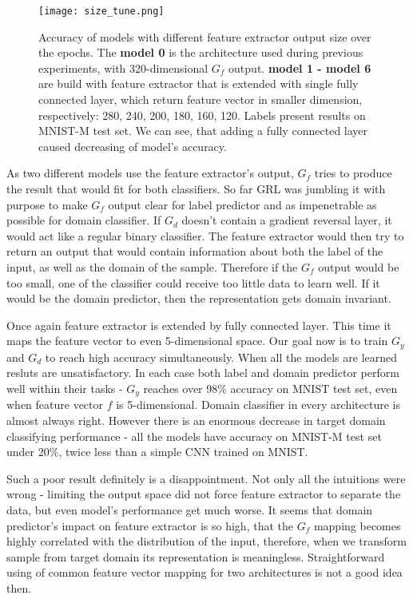 \documentclass{article}
\begin{document}
\begin{figure}[htb]%
    \centering
    \texttt{[image: size\_tune.png]}%
    \caption{Accuracy of models with different feature extractor output size over the epochs. The \textbf{model 0} is the architecture used during previous experiments, with 320-dimensional $G_{f}$ output. \textbf{model 1 - model 6} are build with feature extractor that is extended with single fully connected layer, which return feature vector in smaller dimension, respectively: 280, 240, 200, 180, 160, 120. Labels present results on MNIST-M test set. We can see, that adding a fully connected layer caused decreasing of model's accuracy. }
    \label{fig:size_tune}%
\end{figure}

\par
As two different models use the feature extractor's output, $G_{f}$ tries to produce the result that would fit for both classifiers. So far GRL was jumbling it with purpose to make $G_{f}$ output clear for label predictor and as impenetrable as possible for domain classifier. If $G_{d}$ doesn't contain a gradient reversal layer, it would act like a regular binary classifier. The feature extractor would then try to return an output that would contain information about both the label of the input, as well as the domain of the sample. Therefore if the $G_{f}$ output would be too small, one of the classifier could receive too little data to learn well. If it would be the domain predictor, then the representation gets domain invariant.
\par
Once again feature extractor is extended by fully connected layer. This time it maps the feature vector to even 5-dimensional space. Our goal now is to train $G_{y}$ and $G_{d}$ to reach high accuracy simultaneously. When all the models are learned resluts are unsatisfactory. In each case both label and domain predictor perform well within their tasks - $G_{y}$ reaches over 98\% accuracy on MNIST test set, even when feature vector $f$ is 5-dimensional. Domain classifier in every architecture is almost always right. However there is an enormous decrease in target domain classifying performance - all the models have accuracy on MNIST-M test set under 20\%, twice less than a simple CNN trained on MNIST.
\par
Such a poor result definitely is a disappointment. Not only all the intuitions were wrong - limiting the output space did not force feature extractor to separate the data, but even model's performance get much worse. It seems that domain predictor's impact on feature extractor is so high, that the $G_{f}$ mapping becomes highly correlated with the distribution of the input, therefore, when we transform sample from target domain its representation is meaningless. Straightforward using of common feature vector mapping for two architectures is not a good idea then.
\end{document}
